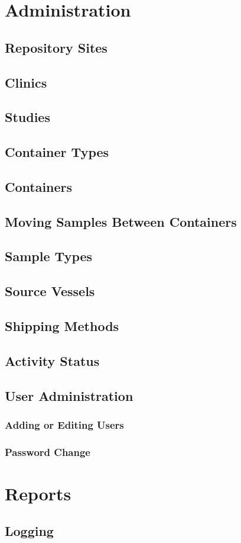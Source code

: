 \chapter{Administration}
\label{chap:administration}

\section{Repository Sites}
\section{Clinics}
\section{Studies}
\section{Container Types}
\section{Containers}
\section{Moving Samples Between Containers}
\section{Sample Types}
\section{Source Vessels}
\section{Shipping Methods}
\section{Activity Status}
\section{User Administration}
\subsection{Adding or Editing Users}
\subsection{Password Change}

\chapter{Reports}
\label{chap:reports}
\section{Logging}
